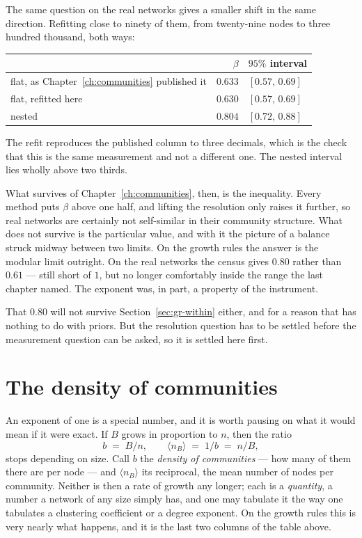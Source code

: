 The same question on the real networks gives a smaller shift in the same
direction. Refitting close to ninety of them, from twenty-nine nodes to three
hundred thousand, both ways:

\begin{center}
\begin{tabular}{lrl}
\hline
 & $\beta$ & $95\%$ interval\\
\hline
flat, as Chapter~\ref{ch:communities} published it & $0.633$ & $[0.57,\,0.69]$\\
flat, refitted here                                & $0.630$ & $[0.57,\,0.69]$\\
nested                                             & $\mathbf{0.804}$ & $[0.72,\,0.88]$\\
\hline
\end{tabular}
\end{center}

\noindent The refit reproduces the published column to three decimals, which is
the check that this is the same measurement and not a different one. The nested
interval lies wholly above two thirds.

What survives of Chapter~\ref{ch:communities}, then, is the inequality. Every
method puts $\beta$ above one half, and lifting the resolution only raises it
further, so real networks are certainly not self-similar in their community
structure. What does not survive is the particular value, and with it the picture
of a balance struck midway between two limits. On the growth rules the answer is
the modular limit outright. On the real networks the census gives $0.80$ rather
than $0.61$ --- still short of $1$, but no longer comfortably inside the range the
last chapter named. The exponent was, in part, a property of the instrument.

That $0.80$ will not survive Section~\ref{sec:gr-within} either, and for a reason
that has nothing to do with priors. But the resolution question has to be settled
before the measurement question can be asked, so it is settled here first.

\section{The density of communities}
\label{sec:gr-density}

An exponent of one is a special number, and it is worth pausing on what it would
mean if it were exact. If $B$ grows in proportion to $n$, then the ratio
\begin{equation}
  b \;=\; B/n, \qquad \langle n_B\rangle \;=\; 1/b \;=\; n/B,
  \label{eq:gr-density}
\end{equation}
stops depending on size. Call $b$ the \emph{density of communities} --- how many
of them there are per node --- and $\langle n_B\rangle$ its reciprocal, the mean
number of nodes per community. Neither is then a rate of growth any longer; each
is a \emph{quantity}, a number a network of any size simply has, and one may
tabulate it the way one tabulates a clustering coefficient or a degree exponent.
On the growth rules this is very nearly what happens, and it is the last two
columns of the table above.

